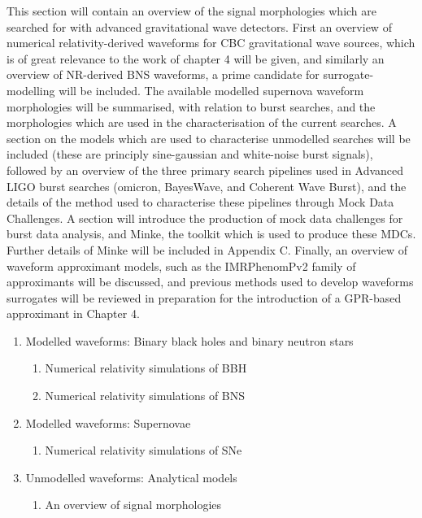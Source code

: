 \documentclass{kentigern}
\theoremstyle{definition}
\begin{document}
\begin{enumerate}
  This section will contain an overview of the signal morphologies
  which are searched for with advanced gravitational wave
  detectors. First an overview of numerical relativity-derived
  waveforms for CBC gravitational wave sources, which is of great
  relevance to the work of chapter 4 will be given, and similarly an
  overview of NR-derived BNS waveforms, a prime candidate for
  surrogate-modelling will be included. The available modelled
  supernova waveform morphologies will be summarised, with relation to
  burst searches, and the morphologies which are used in the
  characterisation of the current searches. A section on the models
  which are used to characterise unmodelled searches will be included
  (these are principly sine-gaussian and white-noise burst signals),
  followed by an overview of the three primary search pipelines used
  in Advanced LIGO burst searches (omicron, BayesWave, and Coherent
  Wave Burst), and the details of the method used to characterise
  these pipelines through Mock Data Challenges. A section will
  introduce the production of mock data challenges for burst data
  analysis, and Minke, the toolkit which is used to produce these
  MDCs. Further details of Minke will be included in Appendix
  C. Finally, an overview of waveform approximant models, such as the
  IMRPhenomPv2 family of approximants will be discussed, and previous
  methods used to develop waveforms surrogates will be reviewed in
  preparation for the introduction of a GPR-based approximant in Chapter 4.

  \begin{enumerate}
  \item Modelled waveforms: Binary black holes and binary neutron stars
    \begin{enumerate}
      \item Numerical relativity simulations of BBH
      \item Numerical relativity simulations of BNS
    \end{enumerate}
    
  \item Modelled waveforms: Supernovae
    \begin{enumerate}
    \item Numerical relativity simulations of SNe
    \end{enumerate}
    
  \item Unmodelled waveforms: Analytical models
    \begin{enumerate}
    \item An overview of signal morphologies
    \end{enumerate}
    

\end{enumerate}
\end{enumerate}
\end{document}
